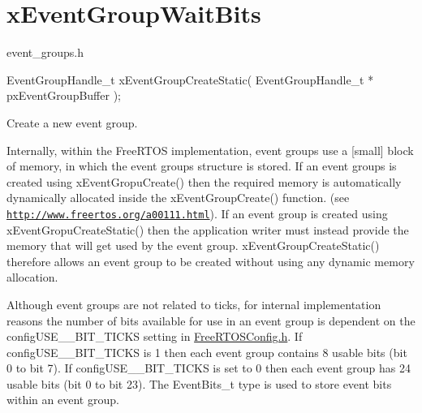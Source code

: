 \hypertarget{group__xEventGroupWaitBits}{}\section{x\+Event\+Group\+Wait\+Bits}
\label{group__xEventGroupWaitBits}
event\+\_\+groups.\+h 
\begin{DoxyPre}
EventGroupHandle\_t xEventGroupCreateStatic( EventGroupHandle\_t * pxEventGroupBuffer );
\end{DoxyPre}


Create a new event group.

Internally, within the Free\+R\+T\+OS implementation, event groups use a \mbox{[}small\mbox{]} block of memory, in which the event group\textquotesingle{}s structure is stored. If an event groups is created using x\+Event\+Gropu\+Create() then the required memory is automatically dynamically allocated inside the x\+Event\+Group\+Create() function. (see \href{http://www.freertos.org/a00111.html}{\tt http\+://www.\+freertos.\+org/a00111.\+html}). If an event group is created using x\+Event\+Gropu\+Create\+Static() then the application writer must instead provide the memory that will get used by the event group. x\+Event\+Group\+Create\+Static() therefore allows an event group to be created without using any dynamic memory allocation.

Although event groups are not related to ticks, for internal implementation reasons the number of bits available for use in an event group is dependent on the config\+U\+S\+E\+\_\+\_\+\+B\+I\+T\+\_\+\+T\+I\+C\+KS setting in \mbox{\hyperlink{FreeRTOSConfig_8h_source}{Free\+R\+T\+O\+S\+Config.\+h}}. If config\+U\+S\+E\+\_\+\_\+\+B\+I\+T\+\_\+\+T\+I\+C\+KS is 1 then each event group contains 8 usable bits (bit 0 to bit 7). If config\+U\+S\+E\+\_\+\_\+\+B\+I\+T\+\_\+\+T\+I\+C\+KS is set to 0 then each event group has 24 usable bits (bit 0 to bit 23). The Event\+Bits\+\_\+t type is used to store event bits within an event group.


